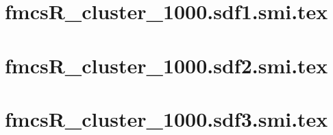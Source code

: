 \documentclass{article}
\begin{document}

\section{fmcsR_cluster_1000.sdf1.smi.tex}

\section{fmcsR_cluster_1000.sdf2.smi.tex}

\section{fmcsR_cluster_1000.sdf3.smi.tex}
\end{document}
